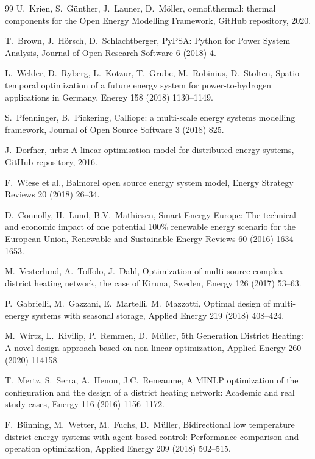 \documentclass[review,3p]{elsarticle}
\begin{document}
\begin{thebibliography}{99}
U.\ Krien, S.\ Günther, J.\ Launer, D.\ Möller,
oemof.thermal: thermal components for the Open Energy Modelling
Framework, GitHub repository, 2020.

T.\ Brown, J.\ Hörsch, D.\ Schlachtberger,
PyPSA: Python for Power System Analysis,
Journal of Open Research Software 6 (2018) 4.

L.\ Welder, D.\ Ryberg, L.\ Kotzur, T.\ Grube, M.\ Robinius,
D.\ Stolten,
Spatio-temporal optimization of a future energy system for
power-to-hydrogen applications in Germany,
Energy 158 (2018) 1130--1149.

S.\ Pfenninger, B.\ Pickering,
Calliope: a multi-scale energy systems modelling framework,
Journal of Open Source Software 3 (2018) 825.

J.\ Dorfner,
urbs: A linear optimisation model for distributed energy systems,
GitHub repository, 2016.

F.\ Wiese et al.,
Balmorel open source energy system model,
Energy Strategy Reviews 20 (2018) 26--34.

D.\ Connolly, H.\ Lund, B.V.\ Mathiesen,
Smart Energy Europe: The technical and economic impact of one
potential 100\% renewable energy scenario for the European Union,
Renewable and Sustainable Energy Reviews 60 (2016) 1634--1653.

M.\ Vesterlund, A.\ Toffolo, J.\ Dahl,
Optimization of multi-source complex district heating network,
the case of Kiruna, Sweden,
Energy 126 (2017) 53--63.

P.\ Gabrielli, M.\ Gazzani, E.\ Martelli, M.\ Mazzotti,
Optimal design of multi-energy systems with seasonal storage,
Applied Energy 219 (2018) 408--424.

M.\ Wirtz, L.\ Kivilip, P.\ Remmen, D.\ Müller,
5th Generation District Heating: A novel design approach based on
non-linear optimization,
Applied Energy 260 (2020) 114158.

T.\ Mertz, S.\ Serra, A.\ Henon, J.C.\ Reneaume,
A MINLP optimization of the configuration and the design of a
district heating network: Academic and real study cases,
Energy 116 (2016) 1156--1172.

F.\ Bünning, M.\ Wetter, M.\ Fuchs, D.\ Müller,
Bidirectional low temperature district energy systems with agent-based
control: Performance comparison and operation optimization,
Applied Energy 209 (2018) 502--515.


\end{thebibliography}
\end{document}

